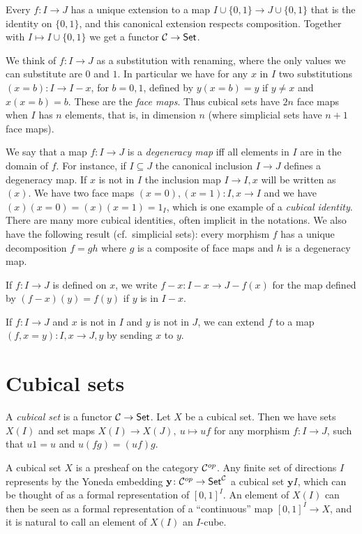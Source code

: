 \documentclass[10pt,a4paper]{article}
\newcommand{\CC}{{\mathcal C}}
\newcommand{\set}[1]{\{#1\}}
\newcommand{\yoneda}{\mathbf{y}}
\begin{document}
Every $f:I\to J$ has a unique extension to a map $I \cup \set{0,1} \to J\cup \set{0,1}$
that is the identity on $\set{0,1}$, and this canonical extension respects composition.
Together with $I\mapsto I \cup \set{0,1}$ we get a functor $\CC\to{\sf Set}$.

 We think of $f:I\to J$ as a substitution with renaming,
 where the only values we can substitute are $0$ and $1$.
In particular we have for any $x$ in $I$ two substitutions $(x=b):I\to I-x$, for $b=0,1$,
defined by $y(x=b) = y$ if $y\neq x$ and $x(x=b) = b$. These are the \emph{face maps}.
Thus cubical sets have $2n$ face maps when $I$ has $n$ elements, that is, in dimension $n$
(where simplicial sets have $n+1$ face maps).

 We say that a map $f:I\to J$ is a {\em degeneracy map} if{f} all elements in $I$ are in
the domain of $f$. For instance, if $I\subseteq J$ the canonical inclusion $I \to J$ defines
a degeneracy map. If $x$ is not in $I$ the inclusion map $I \to I,x$ will be written as $(x)$.
We have two face maps $(x=0), (x=1):I,x\to I$ and we
have $(x)(x=0) = (x)(x=1) = 1_I$, which is one example of a \emph{cubical identity}.
There are many more cubical identities, often implicit in the notations. We also have
the following result (cf.\ simplicial sets): every morphism $f$ has a unique decomposition
$f=gh$ where $g$ is a composite of face maps and $h$ is a degeneracy map.

 If $f:I\to J$ is defined on $x$, we write $f-x:I-x \to J-{f(x)}$ for the map defined by
$(f-x)(y) = f(y)$ if $y$ is in $I-x.$

If $f:I\to J$ and $x$ is not in $I$ and $y$ is not in $J$, we can
extend $f$ to a map $(f,x=y):I,x\to J,y$ by sending $x$ to $y$.

\section{Cubical sets}

A \emph{cubical set} is a functor $\CC\to{\sf Set}$.
Let $X$ be a cubical set. Then we have sets $X(I)$ and set maps
$X(I)\to X(J),~u\longmapsto uf$ for any morphism $f:I\to J$,
such that $u1 = u$ and $u(fg) = (uf)g$.

\medskip

A cubical set $X$ is a presheaf on the category ${\cal C}^{op}$. Any
finite set of directions $I$ represents by the Yoneda embedding
$\yoneda \colon {\cal C}^{op} \to {\sf Set}^{\cal C}$ a cubical set
$\yoneda I$, which can be thought of as a formal representation of
$[0,1]^I$.  An element of $X(I)$ can then be seen as a formal
representation of a ``continuous'' map $[0,1]^I\to X$, and it is
natural to call an element of $X(I)$ an $I$-cube.
\end{document}

